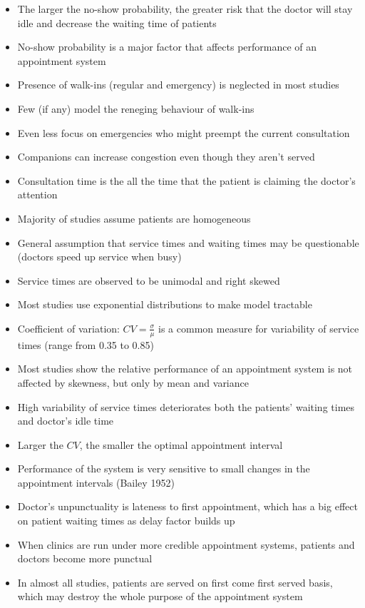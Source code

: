 \documentclass{article}
\begin{document}
\begin{itemize}
    \item The larger the no-show probability, the greater risk that the doctor will stay idle and decrease the waiting time of patients
    \item No-show probability is a major factor that affects performance of an appointment system
    \item Presence of walk-ins (regular and emergency) is neglected in most studies
    \item Few (if any) model the reneging behaviour of walk-ins
    \item Even less focus on emergencies who might preempt the current consultation
    \item Companions can increase congestion even though they aren't served
    \item Consultation time is the all the time that the patient is claiming the doctor's attention
    \item Majority of studies assume patients are homogeneous
    \item General assumption that service times and waiting times may be questionable (doctors speed up service when busy)
    \item Service times are observed to be unimodal and right skewed
    \item Most studies use exponential distributions to make model tractable
    \item Coefficient of variation: $CV = \frac{\sigma}{\mu}$ is a common measure for variability of service times (range from 0.35 to 0.85)
    \item Most studies show the relative performance of an appointment system is not affected by skewness, but only by mean and variance
    \item High variability of service times deteriorates both the patients' waiting times and doctor's idle time
    \item Larger the $CV$, the smaller the optimal appointment interval
    \item Performance of the system is very sensitive to small changes in the appointment intervals (Bailey 1952)
    \item Doctor's unpunctuality is lateness to first appointment, which has a big effect on patient waiting times as delay factor builds up
    \item When clinics are run under more credible appointment systems, patients and doctors become more punctual
    \item In almost all studies, patients are served on first come first served basis, which may destroy the whole purpose of the appointment system

\end{itemize}
\end{document}
